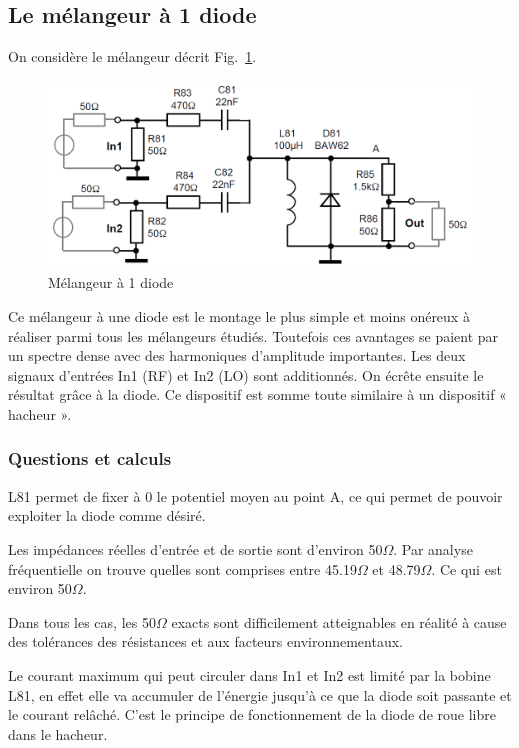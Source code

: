 \documentclass{article}
\begin{document}
\subsection{Le mélangeur à 1 diode}

On considère le mélangeur décrit Fig.~\ref{fig:schema_melangeur_diode}.
\begin{figure}[h!]
	\centering
	\includegraphics[width=.7\textwidth]{schema_melangeur_diode}
	\caption{Mélangeur à 1 diode}
	\label{fig:schema_melangeur_diode}
\end{figure}

Ce mélangeur à une diode est le montage le plus simple et moins onéreux à réaliser parmi tous les mélangeurs étudiés. Toutefois ces avantages se paient par un spectre dense avec des harmoniques d'amplitude importantes.
Les deux signaux d'entrées In1 (RF) et In2 (LO) sont additionnés. On écrête ensuite le résultat grâce à la diode.
Ce dispositif est somme toute similaire à un dispositif « hacheur ».

\subsubsection{Questions et calculs}


L81 permet de fixer à 0 le potentiel moyen au point A, ce qui permet de pouvoir exploiter la diode comme désiré.


Les impédances réelles d'entrée et de sortie sont d'environ 50$\Omega$. Par analyse fréquentielle on trouve quelles sont comprises entre 45.19$\Omega$ et 48.79$\Omega$. Ce qui est environ 50$\Omega$.

Dans tous les cas, les 50$\Omega$ exacts sont difficilement atteignables en réalité à cause des tolérances des résistances et aux facteurs environnementaux.


Le courant maximum qui peut circuler dans In1 et In2 est limité par la bobine L81, en effet elle va accumuler de l'énergie jusqu'à ce que la diode soit passante et le courant relâché. C'est le principe de fonctionnement de la diode de roue libre dans le hacheur.
\end{document}
